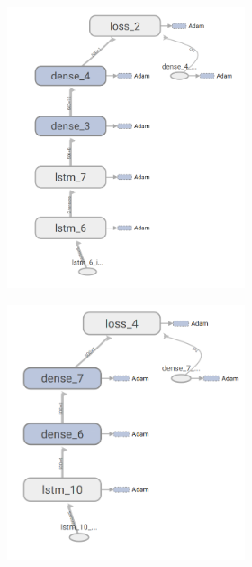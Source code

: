 \begin{figure}
\begin{subfigure}[b]{0.3\linewidth}
\begin{subfigure}[b]{\linewidth}
			\includegraphics[width=\linewidth]{plots/rnn-candidates-2-lstm-2-dense.png}
		\end{subfigure}
	\end{subfigure}
	\begin{subfigure}[b]{0.3\linewidth}
		\begin{subfigure}[b]{\linewidth}
			\includegraphics[width=\linewidth]{plots/rnn-candidates-1-lstm-2-dense.png}

\end{subfigure}
\end{subfigure}
\end{figure}
